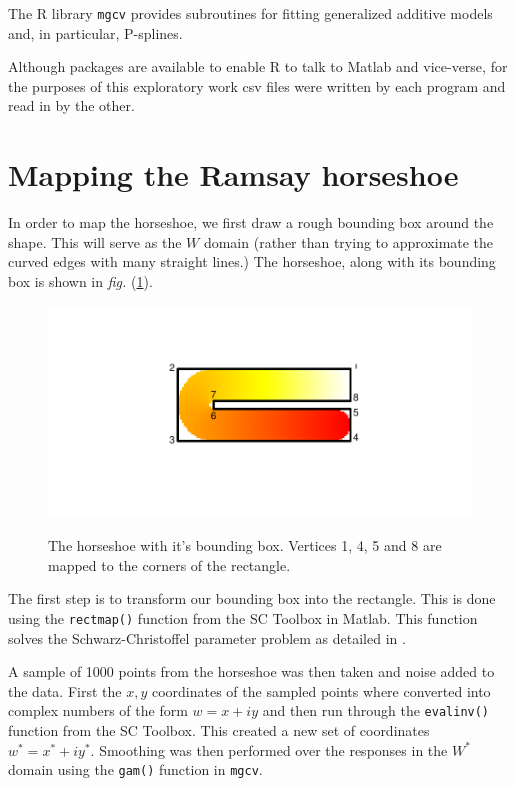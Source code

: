 \documentclass[a4paper,10pt]{amsart}
\newcommand{\sch}{Schwarz-Christoffel }
\newcommand{\fig}[1]{\emph{fig.} (\ref{#1})}
\begin{document}
The \textsf{R} library \texttt{mgcv} provides subroutines for fitting generalized additive models and, in particular, P-splines.

Although packages are available to enable \textsf{R} to talk to Matlab and vice-verse, for the purposes of this exploratory work csv files were written by each program and read in by the other.

\section{Mapping the Ramsay horseshoe}

In order to map the horseshoe, we first draw a rough bounding box around the shape. This will serve as the $W$ domain (rather than trying to approximate the curved edges with many straight lines.) The horseshoe, along with its bounding box is shown in \fig{hswithboundingbox}.

\begin{figure}
\centering
\includegraphics[trim=0.5in 1in 0in 1in]{figs/hswithboundingbox.pdf} \\
\caption{The horseshoe with it's bounding box. Vertices 1, 4, 5 and 8 are mapped to the corners of the rectangle.}
\label{hswithboundingbox}
\end{figure}

The first step is to transform our bounding box into the rectangle. This is done using the \texttt{rectmap()} function from the SC Toolbox in Matlab. This function solves the \sch parameter problem as detailed in \cite{miller08}.

A sample of 1000 points from the horseshoe was then taken and noise added to the data. First the $x,y$ coordinates of the sampled points where converted into complex numbers of the form $w=x+iy$ and then run through the \texttt{evalinv()} function from the SC Toolbox. This created a new set of coordinates $w^*=x^*+iy^*$. Smoothing was then performed over the responses in the $W^*$ domain using the \texttt{gam()} function in \texttt{mgcv}. 
\end{document}
